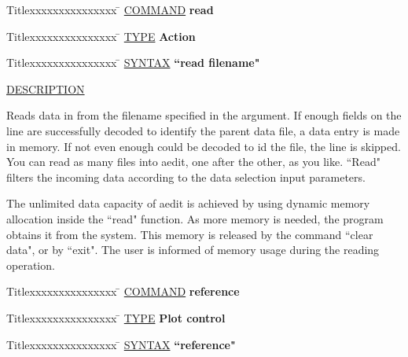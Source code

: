 \begin{tabbing}
Titlexxxxxxxxxxxxxxx \= \kill
\underline{COMMAND} \> {\bf 	read} \\
\end{tabbing}

\begin{tabbing}
Titlexxxxxxxxxxxxxxx \= \kill
\underline{TYPE} \> {\bf 		Action} \\
\end{tabbing}

\begin{tabbing}
Titlexxxxxxxxxxxxxxx \= \kill
\underline{SYNTAX} \> {\bf 		``read filename"} \\
\end{tabbing}

\underline{DESCRIPTION}
\begin{list}{}{\setlength{\leftmargin}{0.5in}
     \setlength{\rightmargin}{0in}}
\item
Reads data in from the filename specified in the argument.
If enough fields on the line are successfully decoded to 
identify the parent data file, a data entry is made in memory.  
If not even enough could be decoded to id the file, the line 
is skipped.  You can read as many files into aedit, one after 
the other, as you like.  ``Read" filters the incoming data 
according to the data selection input parameters.
\item
The unlimited data capacity of aedit is achieved by using
dynamic memory allocation inside the ``read" function.  As
more memory is needed, the program obtains it from the system.
This memory is released by the command ``clear data", or
by ``exit".  The user is informed of memory usage during the
reading operation.
\end{list}
\vspace{.2in}

\begin{tabbing}
Titlexxxxxxxxxxxxxxx \= \kill
\underline{COMMAND} \> {\bf 	reference} \\
\end{tabbing}

\begin{tabbing}
Titlexxxxxxxxxxxxxxx \= \kill
\underline{TYPE} \> {\bf 		Plot control} \\
\end{tabbing}

\begin{tabbing}
Titlexxxxxxxxxxxxxxx \= \kill
\underline{SYNTAX} \> {\bf 		``reference"} \\
\end{tabbing}

